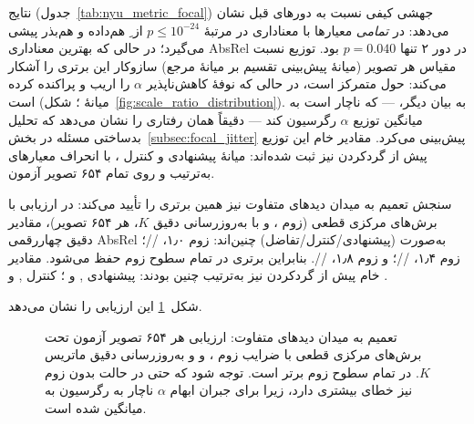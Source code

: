 نتایج (جدول~\ref{tab:nyu_metric_focal}) جهشی کیفی نسبت به دورهای قبل نشان می‌دهد: \proposedmodel{} در \emph{تمامی} معیارها با معناداری در مرتبهٔ $p \le 10^{-24}$ از \controlmodel{}ِ هم‌داده و هم‌بذر پیشی می‌گیرد؛ در حالی که بهترین معناداری AbsRel در دور ۲ تنها $p=0.040$ بود. توزیع نسبت مقیاس هر تصویر (میانهٔ پیش‌بینی تقسیم بر میانهٔ مرجع) سازوکار این برتری را آشکار می‌کند: \proposedmodel{} حول  متمرکز است، در حالی که نوفهٔ کاهش‌ناپذیر $\alpha$ \controlmodel{} را اریب و پراکنده کرده است (میانهٔ ؛ شکل~\ref{fig:scale_ratio_distribution}). به بیان دیگر، \controlmodel{} --- که ناچار است به میانگین توزیع $\alpha$ رگرسیون کند --- دقیقاً همان رفتاری را نشان می‌دهد که تحلیل بدساختی مسئله در بخش~\ref{subsec:focal_jitter} پیش‌بینی می‌کرد.
مقادیر خام این توزیع پیش از گردکردن نیز ثبت شده‌اند: میانهٔ پیشنهادی
 و کنترل ، با انحراف معیارهای به‌ترتیب
 و  روی تمام ۶۵۴ تصویر آزمون.

سنجش تعمیم به میدان دیدهای متفاوت نیز همین برتری را تأیید می‌کند: در ارزیابی با برش‌های مرکزی قطعی (زوم ،  و  با به‌روزرسانی دقیق $K$، هر ۶۵۴ تصویر)، مقادیر دقیق چهاررقمی AbsRel به‌صورت (پیشنهادی/کنترل/تفاضل) چنین‌اند: زوم ۱٫۰، //؛ زوم ۱٫۴، //؛ و زوم ۱٫۸، //. بنابراین برتری در تمام سطوح زوم حفظ می‌شود.
مقادیر خام پیش از گردکردن نیز به‌ترتیب چنین بودند: پیشنهادی ,  و ؛ کنترل ,  و .

شکل~\ref{fig:fov_generalization} این ارزیابی را نشان می‌دهد.

\begin{figure}[htbp]
    \centering
    \caption[تعمیم به میدان دیدهای متفاوت]{تعمیم به میدان دیدهای متفاوت:
    ارزیابی هر ۶۵۴ تصویر آزمون تحت برش‌های مرکزی قطعی با ضرایب زوم
    ،  و  و به‌روزرسانی دقیق
    ماتریس $K$. \proposedmodel{} در تمام سطوح زوم برتر است. توجه شود که
    \controlmodel{} حتی در حالت بدون زوم نیز خطای بیشتری دارد، زیرا برای
    جبران ابهام $\alpha$ ناچار به رگرسیون به میانگین شده است.}
    \label{fig:fov_generalization}
\end{figure}


